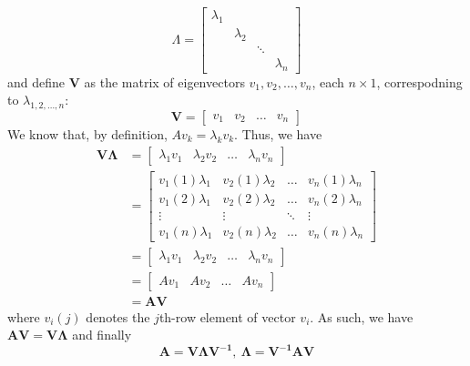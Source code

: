 \documentclass{article}
\begin{document}
\begin{equation*}
    \Lambda=\begin{bmatrix}
        \lambda_1 & & & \\
        &\lambda_2 & & \\
        & & \ddots & \\
        & & & \lambda_n
    \end{bmatrix}
\end{equation*}
and define $\mathbf{V}$ as the matrix of eigenvectors $v_1, v_2, \dots, v_n$, each $n \times 1$, correspodning to $\lambda_{1,2,\dots,n}$:
\begin{equation*}
    \mathbf{V} = \begin{bmatrix}
        v_1 & v_2 & \dots & v_n
    \end{bmatrix}
\end{equation*}
We know that, by definition, $Av_k = \lambda_k v_k$. Thus, we have 
\begin{equation*}
    \begin{aligned}
        \mathbf{V \Lambda} &= \begin{bmatrix}
            \lambda_1 v_1 & \lambda_2 v_2 & \dots & \lambda_n v_n
        \end{bmatrix}\\
        &=\begin{bmatrix}
            v_1(1)\lambda_1 & v_2(1)\lambda_2 & \dots & v_n(1)\lambda_n \\
            v_1(2)\lambda_1 & v_2(2) \lambda_2 & \dots & v_n(2) \lambda_n \\
            \vdots & \vdots & \ddots & \vdots \\
            v_1(n) \lambda_1 & v_2(n) \lambda_2 & \dots & v_n(n)\lambda_n
        \end{bmatrix} \\
        &= \begin{bmatrix}
            \lambda_1v_1 & \lambda_2v_2 & \dots & \lambda_n v_n
        \end{bmatrix}\\
        &=\begin{bmatrix}
            Av_1 & Av_2 & \dots & Av_n
        \end{bmatrix}\\
        &=\mathbf{AV}
    \end{aligned}
\end{equation*}
where $v_i(j)$ denotes the $j$th-row element of vector $v_i$. As such, we have $\mathbf{AV=V\Lambda}$ and finally 
\begin{equation*}
    \mathbf{A= V\Lambda V^{-1}},\ \mathbf{\Lambda = V^{-1}AV}
\end{equation*}
\end{document}
